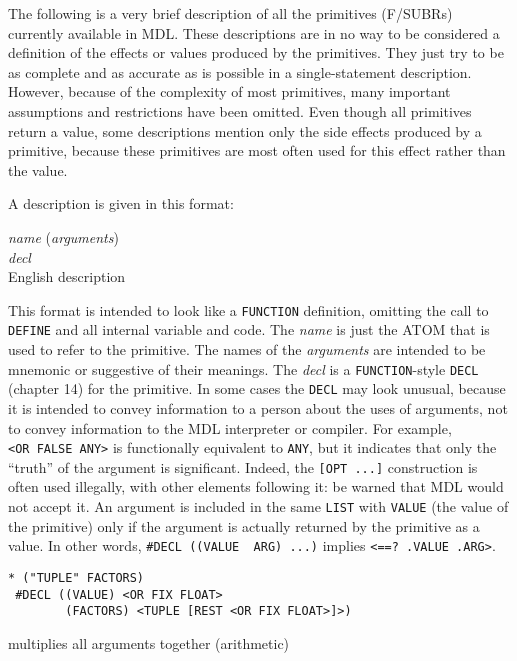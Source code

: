 \documentclass[a4paper]{scrbook}
\begin{document}
\label{appendix-2.-predefined-subroutines}

The following is a very brief description of all the primitives (F/SUBRs) currently available in MDL. These descriptions
are in no way to be considered a definition of the effects or values produced by the primitives. They just try to be as
complete and as accurate as is possible in a single-statement description. However, because of the complexity of most
primitives, many important assumptions and restrictions have been omitted. Even though all primitives return a value, some
descriptions mention only the side effects produced by a primitive, because these primitives are most often used for this
effect rather than the value.

A description is given in this format:

\emph{name} (\emph{arguments})\\
\emph{decl}\\
English description

This format is intended to look like a \texttt{FUNCTION} definition, omitting the call to \texttt{DEFINE} and all internal
variable and code. The \emph{name} is just the ATOM that is used to refer to the primitive. The names of the
\emph{arguments} are intended to be mnemonic or suggestive of their meanings. The \emph{decl} is a \texttt{FUNCTION}-style
\texttt{DECL} (chapter 14) for the primitive. In some cases the \texttt{DECL} may look unusual, because it is intended to
convey information to a person about the uses of arguments, not to convey information to the MDL interpreter or compiler.
For example, \texttt{\textless{}OR\ FALSE\ ANY\textgreater{}} is functionally equivalent to \texttt{ANY}, but it indicates
that only the ``truth'' of the argument is significant. Indeed, the \texttt{{[}OPT\ ...{]}} construction is often used
illegally, with other elements following it: be warned that MDL would not accept it. An argument is included in the same
\texttt{LIST} with \texttt{VALUE} (the value of the primitive) only if the argument is actually returned by the primitive
as a value. In other words, \texttt{\#DECL\ ((VALUE\ \ ARG)\ ...)} implies
\texttt{\textless{}==?\ .VALUE\ .ARG\textgreater{}}.

\begin{verbatim}
* ("TUPLE" FACTORS)
 #DECL ((VALUE) <OR FIX FLOAT>
        (FACTORS) <TUPLE [REST <OR FIX FLOAT>]>)
\end{verbatim}

multiplies all arguments together (arithmetic)
\end{document}
